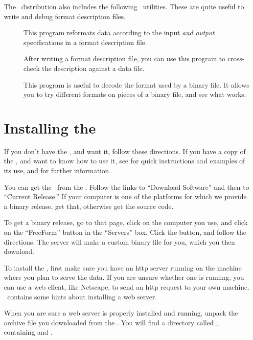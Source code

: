 The \ffs\ distribution also includes the following \ffnd\ utilities.
These are quite useful to write and debug format description files.

\begin{description}
\item[] This program reformats data according to the
  input \emph{and output} specifications in a format description file.

\item[] After writing a format description file, you can
  use this program to cross-check the description against a data file.

\item[] This program is useful to decode the format used
  by a binary file.  It allows you to try different formats on pieces
  of a binary file, and see what works.
\end{description}


\section{Installing the \ffs}
\label{ff,install-dods}

If you don't have the \ffs , and want it, follow these directions.  If
you have a copy of the \ffs , and want to know how to use it, see
 for quick instructions and examples of its use, and
 for further information.

You can get the \ffs\ from the \DODShome . Follow the links to
``Download Software'' and then to ``Current Release.''  If your
computer is one of the platforms for which we provide a binary release,
get that, otherwise get the source code.

To get a binary release, go to that page, click on the computer you
use, and click on the ``FreeForm'' button in the ``Servers'' box.
Click the  button, and follow the directions.  The
server will make a custom binary file for you, which you then
download.

To install the \ffs , first make sure you have an http server running
on the machine where you plan to serve the data.  If you are unsure
whether one is running, you can use a web client, like Netscape, to
send an http request to your own machine.  \DODSuser\ contains some
hints about installing a web server.

When you are sure a web server is properly installed and running,
unpack the archive file you downloaded from the \DODShome .  You will
find a directory called , containing  and
.


